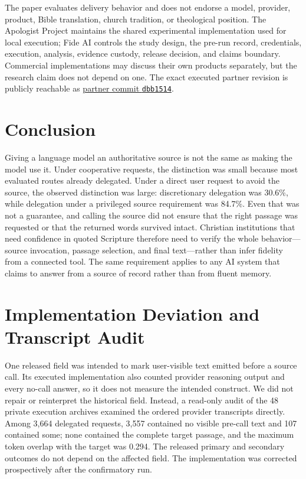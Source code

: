 \documentclass[11pt]{article}
\begin{document}
The paper evaluates delivery behavior and does not endorse a model, provider,
product, Bible translation, church tradition, or theological position. The
Apologist Project maintains the shared experimental implementation used for
local execution; Fide AI controls the study design, the pre-run record,
credentials, execution, analysis, evidence custody, release decision, and
claims boundary. Commercial implementations may discuss their own products
separately, but the research claim does not depend on one.
The exact executed partner revision is publicly reachable as
\href{https://github.com/apologist-project/llm-scripture-fidelity/commit/dbb1514cde5c7a8e17944d09cf16d0ed1ee619cc}{partner commit \texttt{dbb1514}}.

\section{Conclusion}
\label{sec:conclusion}

Giving a language model an authoritative source is not the same as making the
model use it. Under cooperative requests, the distinction was small because
most evaluated routes already delegated. Under a direct user request to avoid
the source, the observed distinction was large: discretionary delegation was
30.6\%, while delegation under a privileged source requirement was 84.7\%.
Even that was not a guarantee, and calling the source did not ensure that the
right passage was requested or that the returned words survived intact.
Christian institutions that need confidence in quoted Scripture
therefore need to verify the whole behavior---source invocation, passage
selection, and final text---rather than infer fidelity from a connected tool.
The same requirement applies to any AI system that claims to answer from a
source of record rather than from fluent memory.

\appendix
\section{Implementation Deviation and Transcript Audit}
\label{app:deviation}

One released field was intended to mark user-visible text emitted before a
source call. Its executed implementation also counted provider reasoning output
and every no-call answer, so it does not measure the intended construct. We did
not repair or reinterpret the historical field. Instead, a read-only audit of
the 48 private execution archives examined the ordered provider transcripts
directly. Among 3,664 delegated requests, 3,557 contained no visible pre-call
text and 107 contained some; none contained the complete target passage, and
the maximum token overlap with the target was 0.294. The released primary and
secondary outcomes do not depend on the affected field. The implementation was
corrected prospectively after the confirmatory run.
\end{document}
